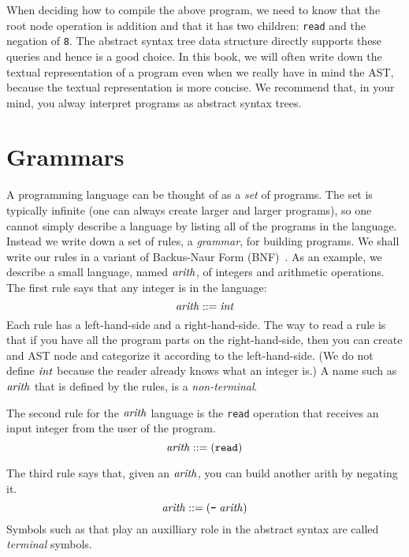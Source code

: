 \documentclass[12pt]{book}
\begin{document}
When deciding how to compile the above program, we need to know that
the root node operation is addition and that it has two children:
\texttt{read} and the negation of \texttt{8}. The abstract syntax tree
data structure directly supports these queries and hence is a good
choice. In this book, we will often write down the textual
representation of a program even when we really have in mind the AST,
because the textual representation is more concise.  We recommend
that, in your mind, you alway interpret programs as abstract syntax
trees.

\section{Grammars}
\label{sec:grammar}

A programming language can be thought of as a \emph{set} of programs.
The set is typically infinite (one can always create larger and larger
programs), so one cannot simply describe a language by listing all of
the programs in the language. Instead we write down a set of rules, a
\emph{grammar}, for building programs. We shall write our rules in a
variant of Backus-Naur Form (BNF)~\citep{Backus:1960aa,Knuth:1964aa}.
As an example, we describe a small language, named $\mathit{arith}$, of
integers and arithmetic operations. The first rule says that any
integer is in the language:
\begin{equation}
\mathit{arith} ::= \mathit{int}  \label{eq:arith-int}
\end{equation}
Each rule has a left-hand-side and a right-hand-side. The way to read
a rule is that if you have all the program parts on the
right-hand-side, then you can create and AST node and categorize it
according to the left-hand-side. (We do not define $\mathit{int}$ because the
reader already knows what an integer is.) A name such as $\mathit{arith}$
that is defined by the rules, is a \emph{non-terminal}.

The second rule for the $\mathit{arith}$ language is the \texttt{read}
operation that receives an input integer from the user of the program.
\begin{equation}
  \mathit{arith} ::= (\texttt{read}) \label{eq:arith-read}
\end{equation}

The third rule says that, given an $\mathit{arith}$, you can build
another arith by negating it.
\begin{equation}
  \mathit{arith} ::= (\texttt{-} \; \mathit{arith})  \label{eq:arith-neg}
\end{equation}
Symbols such as \key{-} that play an auxilliary role in the abstract
syntax are called \emph{terminal} symbols.
\end{document}
